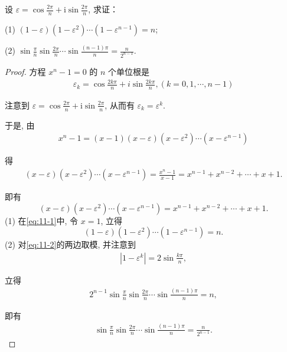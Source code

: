 \begin{example}
	设 $\varepsilon=\cos \frac{2 \pi}{n}+\mathrm{i} \sin \frac{2 \pi}{n}$, 求证：

	(1) $(1-\varepsilon)\left(1-\varepsilon^2\right) \cdots\left(1-\varepsilon^{n-1}\right)=n$;

	(2) $\sin \frac{\pi}{n} \sin \frac{2 \pi}{n} \cdots \sin \frac{(n-1) \pi}{n}=\frac{n}{2^{n-1}}$.
\end{example}
\begin{proof}
	方程 $x^n-1=0$ 的 $n$ 个单位根是
	\begin{align*}
		\varepsilon_k=\cos \frac{2 k \pi}{n}+i \sin \frac{2 k \pi}{n},(k=0,1, \cdots, n-1)
	\end{align*}

	注意到 $\varepsilon=\cos \frac{2 \pi}{n}+\mathrm{i} \sin \frac{2 \pi}{n}$, 从而有 $\varepsilon_k=\varepsilon^k$.

	于是, 由
	\begin{align*}
		x^n-1=(x-1)(x-\varepsilon)\left(x-\varepsilon^2\right) \cdots\left(x-\varepsilon^{n-1}\right)
	\end{align*}

	得
	\begin{align*}
		(x-\varepsilon)\left(x-\varepsilon^2\right) \cdots\left(x-\varepsilon^{n-1}\right)=\frac{x^n-1}{x-1}=x^{n-1}+x^{n-2}+\cdots+x+1 .
	\end{align*}

	即有
	\begin{equation}\label{eq:11-1}
		(x-\varepsilon)\left(x-\varepsilon^2\right) \cdots\left(x-\varepsilon^{n-1}\right)=x^{n-1}+x^{n-2}+\cdots+x+1 .
	\end{equation}
	(1) 在\autoref{eq:11-1}中, 令 $x=1$, 立得
	\begin{equation}\label{eq:11-2}
		(1-\varepsilon)\left(1-\varepsilon^2\right) \cdots\left(1-\varepsilon^{n-1}\right)=n .
	\end{equation}
	(2) 对\autoref{eq:11-2}的两边取模, 并注意到
	\begin{align*}
		\left|1-\varepsilon^k\right|=2 \sin \frac{k \pi}{n},
	\end{align*}

	立得
	\begin{align*}
		2^{n-1} \sin \frac{\pi}{n} \sin \frac{2 \pi}{n} \cdots \sin \frac{(n-1) \pi}{n}=n,
	\end{align*}

	即有
	\begin{align*}
		\sin \frac{\pi}{n} \sin \frac{2 \pi}{n} \cdots \sin \frac{(n-1) \pi}{n}=\frac{n}{2^{n-1}}.
	\end{align*}
\end{proof}

